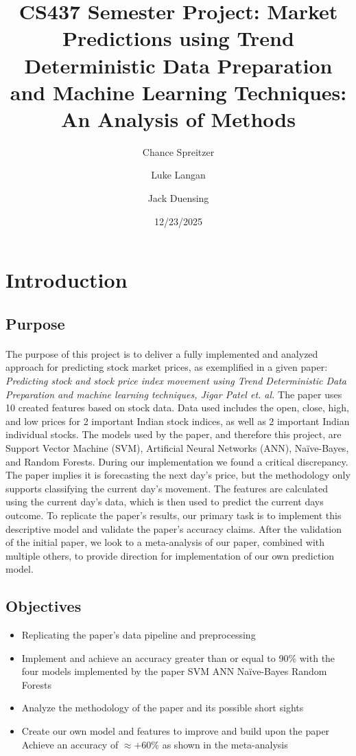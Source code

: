 \documentclass[11pt]{article}
\title{CS437 Semester Project: Market Predictions using Trend Deterministic Data Preparation and Machine Learning Techniques: An Analysis of Methods}
\date{12/23/2025}
\author{Chance Spreitzer \and Luke Langan \and Jack Duensing}
\begin{document}
	
	\maketitle
	
	\section{Introduction}
	
		\subsection{Purpose}
	
			\paragraph{} The purpose of this project is to deliver a fully implemented and analyzed approach for predicting stock market prices, as exemplified in a given paper: \textit{Predicting stock and stock price index movement using Trend Deterministic Data Preparation and machine learning techniques, Jigar Patel et. al.} The paper uses 10 created features based on stock data. Data used includes the open, close, high, and low prices for 2 important Indian stock indices, as well as 2 important Indian individual stocks. The models used by the paper, and therefore this project, are Support Vector Machine (SVM), Artificial Neural Networks (ANN), Naïve-Bayes, and Random Forests. During our implementation we found a critical discrepancy. The paper implies it is forecasting the next day’s price, but the methodology only supports classifying the current day’s movement. The features are calculated using the current day’s data, which is then used to predict the current days outcome. To replicate the paper’s results, our primary task is to implement this descriptive model and validate the paper’s accuracy claims. After the validation of the initial paper, we look to a meta-analysis of our paper, combined with multiple others, to provide direction for implementation of our own prediction model.
	
		\subsection{Objectives}
		
			\begin{itemize}
				\item Replicating the paper's data pipeline and preprocessing
				\item Implement and achieve an accuracy greater than or equal to 90\% with the four models implemented by the paper
					\subitem SVM
					\subitem ANN
					\subitem Naïve-Bayes
					\subitem Random Forests
				\item Analyze the methodology of the paper and its possible short sights
				\item Create our own model and features to improve and build upon the paper
				\subitem Achieve an accuracy of $\approx+60\%$ as shown in the meta-analysis
			\end{itemize}
	
\end{document}
